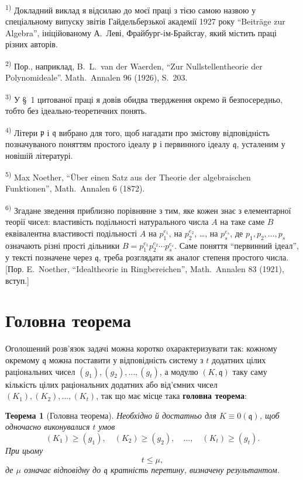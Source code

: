 \documentclass[11pt]{article}
\newcommand{\foreign}[1]{#1}
\theoremstyle{plain}
\newtheorem{satz}{Теорема}
\begin{document}
{\footnotesize
\textsuperscript{1)} Докладний виклад я відсилаю до моєї праці з тією самою
назвою у спеціальному випуску звітів Гайдельберзької академії 1927 року
``Beiträge zur Algebra'', ініційованому А.\ Леві, Фрайбург-ім-Брайсгау, який
містить праці різних авторів.

\textsuperscript{2)} Пор., наприклад, B.\ L.\ van der Waerden, ``Zur Nullstellentheorie der Polynomideale''.
\foreign{Math.\ Annalen} 96 (1926), S.~203.

\textsuperscript{3)} У \S~1 цитованої праці я довів обидва твердження окремо й
безпосередньо, тобто без ідеально-теоретичних понять.

\textsuperscript{4)} Літери $\mathfrak{p}$ і $\mathfrak{q}$ вибрано для того, щоб нагадати про
змістову відповідність позначуваного поняттям простого ідеалу
$\mathfrak{p}$ і первинного ідеалу $\mathfrak{q}$, усталеним у новішій літературі.

\textsuperscript{5)} Max Noether, ``Über einen Satz aus der Theorie der algebraischen Funktionen'',
\foreign{Math.\ Annalen} 6 (1872).

\textsuperscript{6)} Згадане зведення приблизно порівнянне з тим, яке кожен знає з
елементарної теорії чисел: властивість подільності натурального числа
$A$ на таке саме $B$ еквівалентна властивості подільності $A$ на
$p_{1}^{e_{1}}$, на $p_{2}^{e_{2}}$, \ldots, на $p_{s}^{e_{s}}$, де
$p_{1}, p_{2}, \ldots, p_{s}$ означають різні прості дільники
$B = p_{1}^{e_{1}}p_{2}^{e_{2}} \cdots p_{s}^{e_{s}}$. Саме поняття
``первинний ідеал'', у тексті позначене через $\mathfrak{q}$, треба
розглядати як аналог степеня простого числа. [Пор. E.\ Noether,
``Idealtheorie in Ringbereichen'', \foreign{Math.\ Annalen} 83 (1921), вступ.]
}

\newpage
\section*{Головна теорема}

Оголошений розв'язок задачі можна коротко охарактеризувати так:
кожному окремому $\mathfrak{q}$ можна поставити у відповідність
систему з $t$ додатних цілих раціональних чисел
$(g_{1}), (g_{2}), \ldots, (g_{t})$, а модулю $(K, \mathfrak{q})$ таку
саму кількість цілих раціональних додатних або від'ємних чисел
$(K_{1}), (K_{2}), \ldots, (K_{t})$, так що має місце така
\textbf{головна теорема}:

\begin{satz}[Головна теорема]\label{satz:kap-II}
Необхідно й достатньо для $K \equiv 0(\mathfrak{q})$, щоб одночасно
виконувалися $t$ умов
\[
(K_{1}) \geq (g_{1}), \quad (K_{2}) \geq (g_{2}), \quad\ldots,\quad (K_{t}) \geq (g_{t}).
\]
При цьому
\[
t \leq \mu,
\]
де $\mu$ означає відповідну до $\mathfrak{q}$ кратність перетину,
визначену результантом.
\end{satz}
\end{document}
